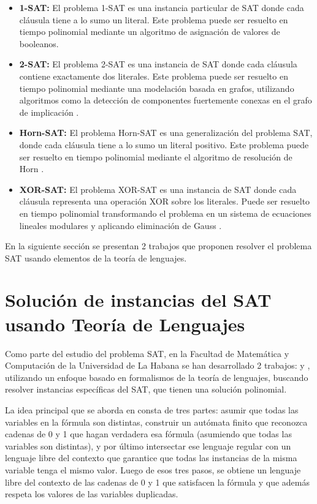 \documentclass[12pt]{article}
\begin{document}
\begin{itemize}
  \item \textbf{1-SAT:} El problema 1-SAT es una instancia particular de SAT donde cada cláusula tiene a lo sumo un literal.
        Este problema puede ser resuelto en tiempo polinomial mediante un algoritmo de asignación de valores de booleanos.
        
  \item \textbf{2-SAT:} El problema 2-SAT es una instancia de SAT donde cada cláusula contiene exactamente dos literales.  Este problema puede ser resuelto en tiempo polinomial mediante una modelación basada en grafos, utilizando algoritmos como la detección de componentes fuertemente conexas en el grafo de implicación \cite{2satbib}.
        
  \item \textbf{Horn-SAT:} El problema Horn-SAT es una generalización del problema SAT, donde cada cláusula tiene a lo sumo un literal positivo.  Este problema puede ser resuelto en tiempo polinomial mediante el algoritmo de resolución de Horn \cite{hornsatbib}.
        
  \item \textbf{XOR-SAT:} El problema XOR-SAT es una instancia de SAT donde cada cláusula representa una operación XOR sobre los literales. Puede ser resuelto en tiempo polinomial transformando el problema en un sistema de ecuaciones lineales modulares y aplicando eliminación de Gauss \cite{xorsatbib}.
\end{itemize}

En la siguiente sección se presentan 2 trabajos que proponen resolver el problema SAT usando elementos de la teoría de lenguajes.

\section{Solución de instancias del SAT usando Teoría de Lenguajes}

Como parte del estudio del problema SAT, en la Facultad de Matemática y Computación de la Universidad de La Habana
se han desarrollado 2 trabajos: \cite{aCFSAT} y \cite{aSRCSAT}, utilizando un enfoque basado en formalismos de la teoría de lenguajes, buscando resolver 
instancias específicas del SAT, que tienen una solución polinomial.

La idea principal que se aborda en \cite{aCFSAT} consta de tres partes: asumir que todas las variables en 
la fórmula son distintas, construir un autómata finito que reconozca cadenas de 0 y 1 que hagan verdadera 
esa fórmula (asumiendo que todas las variables son distintas), y por último intersectar ese lenguaje 
regular con un lenguaje libre del contexto que garantice que todas las instancias de la misma variable 
tenga el mismo valor. Luego de esos tres pasos, se obtiene un lenguaje libre del contexto de las 
cadenas de 0 y 1 que satisfacen la fórmula y que además respeta los valores de las variables duplicadas. 
\end{document}
